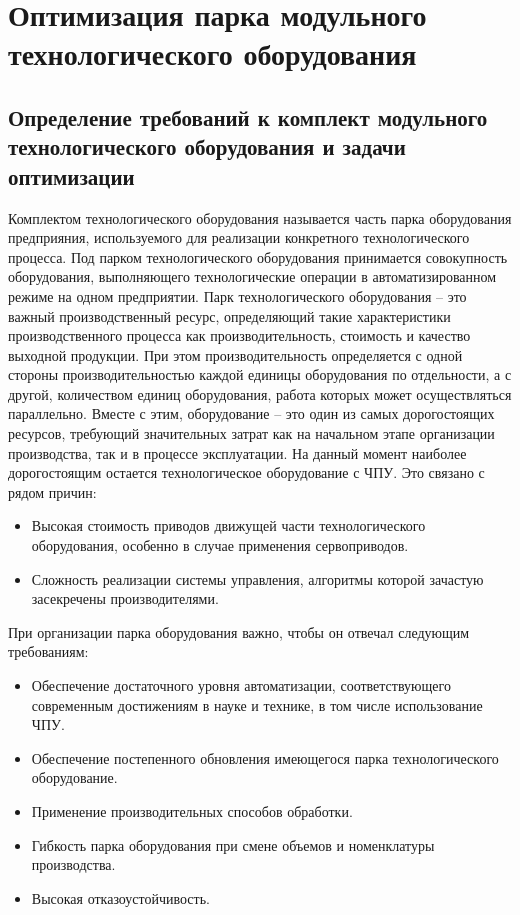 \section{Оптимизация парка модульного технологического оборудования}
	 
\subsection{Определение требований к комплект модульного технологического оборудования и задачи оптимизации}

Комплектом технологического оборудования называется часть парка оборудования предприяния, используемого для реализации конкретного технологического процесса. Под парком технологического оборудования принимается совокупность оборудования, выполняющего технологические операции в автоматизированном режиме на одном предприятии. Парк технологического оборудования -- это важный производственный ресурс, определяющий такие характеристики производственного процесса как производительность, стоимость и качество выходной продукции. При этом производительность определяется с одной стороны производительностью каждой единицы оборудования по отдельности, а с другой, количеством единиц оборудования, работа которых может осуществляться параллельно.  Вместе с этим, оборудование -- это один из самых дорогостоящих ресурсов, требующий значительных затрат как на начальном этапе организации производства, так и в процессе эксплуатации. На данный момент наиболее дорогостоящим остается технологическое оборудование с ЧПУ. Это связано с рядом причин:

\begin{itemize}
	\item Высокая стоимость приводов движущей части технологического оборудования, особенно в случае применения сервоприводов.
	\item Сложность реализации системы управления, алгоритмы которой зачастую засекречены производителями.
\end{itemize}

При организации парка оборудования важно, чтобы он отвечал следующим требованиям:

\begin{itemize}
	\item Обеспечение достаточного уровня автоматизации, соответствующего современным достижениям в науке и технике, в том числе использование ЧПУ.
	\item Обеспечение постепенного обновления имеющегося парка технологического оборудование.
	\item Применение производительных способов обработки.
	\item Гибкость парка оборудования при смене объемов и номенклатуры производства.
	\item Высокая отказоустойчивость.
\end{itemize}

